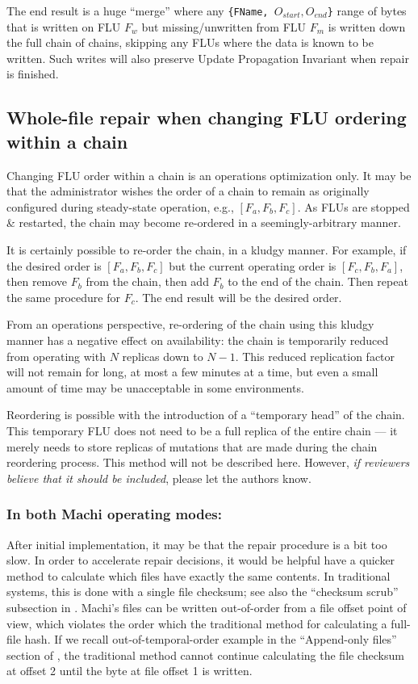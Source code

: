 \documentclass[preprint,10pt]{sigplanconf}
\begin{document}
The end result is a huge ``merge'' where any
{\tt \{FName, $O_{start}, O_{end}$\}} range of bytes that is written
on FLU $F_w$ but missing/unwritten from FLU $F_m$ is written down the full chain
of chains, skipping any FLUs where the data is known to be written.
Such writes will also preserve Update Propagation Invariant when
repair is finished.

\subsection{Whole-file repair when changing FLU ordering within a chain}
\label{sub:repair-chain-re-ordering}

Changing FLU order within a chain is an operations optimization only.
It may be that the administrator wishes the order of a chain to remain
as originally configured during steady-state operation, e.g.,
$[F_a,F_b,F_c]$.  As FLUs are stopped \& restarted, the chain may
become re-ordered in a seemingly-arbitrary manner.

It is certainly possible to re-order the chain, in a kludgy manner.
For example, if the desired order is $[F_a,F_b,F_c]$ but the current
operating order is $[F_c,F_b,F_a]$, then remove $F_b$ from the chain,
then add $F_b$ to the end of the chain.  Then repeat the same
procedure for $F_c$.  The end result will be the desired order.

From an operations perspective, re-ordering of the chain
using this kludgy manner has a
negative effect on availability: the chain is temporarily reduced from
operating with $N$ replicas down to $N-1$.  This reduced replication
factor will not remain for long, at most a few minutes at a time, but
even a small amount of time may be unacceptable in some environments.

Reordering is possible with the introduction of a ``temporary head''
of the chain.  This temporary FLU does not need to be a full replica
of the entire chain --- it merely needs to store replicas of mutations
that are made during the chain reordering process.  This method will
not be described here.  However, {\em if reviewers believe that it should
be included}, please let the authors know.

\subsubsection{In both Machi operating modes:}
After initial implementation, it may be that the repair procedure is a
bit too slow.  In order to accelerate repair decisions, it would be
helpful have a quicker method to calculate which files have exactly
the same contents.  In traditional systems, this is done with a single
file checksum; see also the ``checksum scrub'' subsection in
\cite{machi-design}.
Machi's files can be written out-of-order from a file offset point of
view, which violates the order which the traditional method for
calculating a full-file hash.  If we recall out-of-temporal-order
example in the ``Append-only files'' section of \cite{machi-design},
the traditional method cannot
continue calculating the file checksum at offset 2 until the byte at
file offset 1 is written.
\end{document}
